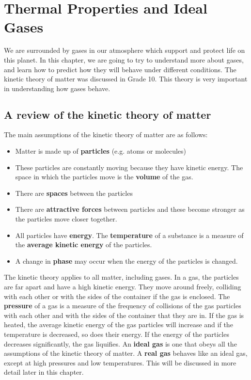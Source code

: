 






\chapter{Thermal Properties and Ideal Gases}
\label{chap:gases}

We are surrounded by gases in our atmosphere which support and protect life on this planet. In this chapter, we are going to try to understand more about gases, and learn how to predict how they will behave under different conditions. The kinetic theory of matter was discussed in Grade 10. This theory is very important in understanding how gases behave.



\section{A review of the kinetic theory of matter}
\label{sec:gases:kinetic theory} 

The main assumptions of the kinetic theory of matter are as follows:
\begin{itemize} 
  \item{Matter is made up of \textbf{particles} (e.g. atoms or molecules)}
\item{These particles are constantly moving because they have kinetic energy. The space in which the particles move is the \textbf{volume} of the gas.}
  \item{There are \textbf{spaces} between the particles}
  \item{There are \textbf{attractive forces} between particles and these become stronger as the particles move closer together.}
  \item{All particles have \textbf{energy}. The \textbf{temperature} of a substance is a measure of the \textbf{average kinetic energy} of the particles.}
  \item{A change in \textbf{phase} may occur when the energy of the particles is changed.}
\end{itemize}

The kinetic theory applies to all matter, including gases. In a gas, the particles are far apart and have a high kinetic energy. They move around freely, colliding with each other or with the sides of the container if the gas is enclosed. The \textbf{pressure} of a gas is a measure of the frequency of collisions of the gas particles with each other and with the sides of the container that they are in. If the gas is heated, the average kinetic energy of the gas particles will increase and if the temperature is decreased, so does their energy. If the energy of the particles decreases significantly, the gas liquifies. An \textbf{ideal gas} is one that obeys all the assumptions of the kinetic theory of matter. A \textbf{real gas} behaves like an ideal gas, except at high pressures and low temperatures. This will be discussed in more detail later in this chapter.

